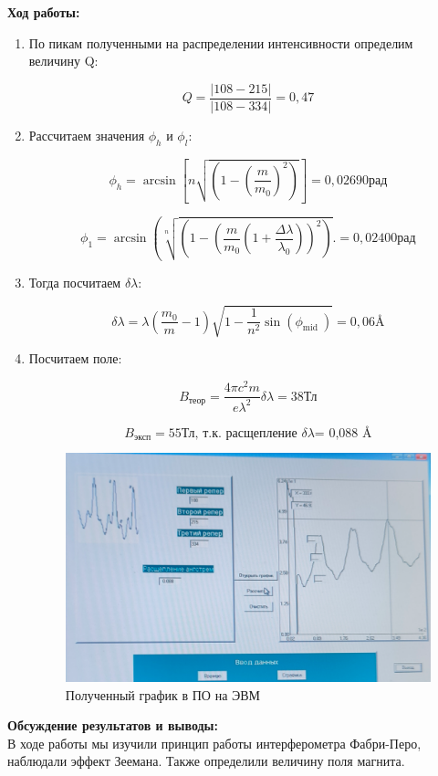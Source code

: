 \documentclass[a4paper, 12pt]{article}%
\begin{document}
	\newpage
	\textbf{Ход работы: }\\
	\begin{enumerate}
		\item По пикам полученными на распределении интенсивности определим величину Q:
		
		$$ Q = \frac{|108-215|}{|108-334|} = 0,47 $$
		
		\item Рассчитаем значения $\phi_h$ и $\phi_l$:
		
		$$ \phi_h=\arcsin \left[n \sqrt{\left(1-\left(\frac{m}{m_0}\right)^2\right)}\right] = 0,02690 \text{рад}$$
		
		$$ \phi_1=\arcsin \left(\sqrt[n]{\left(1-\left(\frac{m}{m_0}\left(1+\frac{\Delta \lambda}{\lambda_0}\right)\right)^2\right)} .\right. = 0,02400 \text{рад}$$ 
		
		\item Тогда посчитаем $\delta \lambda$:
		
		$$ \delta \lambda=\lambda\left(\frac{m_0}{m}-1\right) \sqrt{1-\frac{1}{n^2} \sin \left(\phi_{\text {mid }}\right)} = 0,06 \text{\AA} $$
		
		\item Посчитаем поле:
		
		$$ B_{\text{теор}} = \frac{4\pi c^2 m}{ e \lambda^2} \delta \lambda = 38 \text{Тл}$$
		
		$$ B_{\text{эксп}} = 55 \text{Тл, т.к. расщепление $\delta \lambda $= 0,088 \AA}$$
		
		
		\begin{figure}[h!]
			\centering
			\includegraphics[width=1\linewidth]{graph}
			\caption{Полученный график в ПО на ЭВМ}
		\end{figure}
		
		
		
		
	\end{enumerate}
	
	\textbf{Обсуждение результатов и выводы: }\\
	
	В ходе работы мы изучили принцип работы интерферометра Фабри-Перо, наблюдали эффект Зеемана. Также определили величину поля магнита.
	
	
	
	
	
	
	
	
\end{document}
